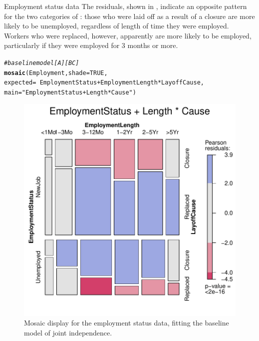 \documentclass[11pt]{book}\usepackage[]{graphicx}\usepackage[]{color}
\makeatletter
\newcommand{\hlnum}[1]{\textcolor[rgb]{0.686,0.059,0.569}{#1}}%
\newcommand{\hlstr}[1]{\textcolor[rgb]{0.192,0.494,0.8}{#1}}%
\newcommand{\hlcom}[1]{\textcolor[rgb]{0.678,0.584,0.686}{\textit{#1}}}%
\newcommand{\hlopt}[1]{\textcolor[rgb]{0,0,0}{#1}}%
\newcommand{\hlstd}[1]{\textcolor[rgb]{0.345,0.345,0.345}{#1}}%
\newcommand{\hlkwc}[1]{\textcolor[rgb]{0.333,0.667,0.333}{#1}}%
\newcommand{\hlkwd}[1]{\textcolor[rgb]{0.737,0.353,0.396}{\textbf{#1}}}%
\newenvironment{kframe}{%
 \def\at@end@of@kframe{}%
 \ifinner\ifhmode%
  \def\at@end@of@kframe{\end{minipage}}%
  \begin{minipage}{\columnwidth}%
 \fi\fi%
 \def\FrameCommand##1{\hskip\@totalleftmargin \hskip-\fboxsep
 \colorbox{shadecolor}{##1}\hskip-\fboxsep
     \hskip-\linewidth \hskip-\@totalleftmargin \hskip\columnwidth}%
 \MakeFramed {\advance\hsize-\width
   \@totalleftmargin\z@ \linewidth\hsize
   \@setminipage}}%
 {\par\unskip\endMakeFramed%
 \at@end@of@kframe}
\newenvironment{knitrout}{}{} %
\renewenvironment{knitrout}{\small\renewcommand{\baselinestretch}{.85}}{} %
\makeatother
\begin{document}
\begin{Example}[employ]{Employment status data}
The residuals, shown in ,
indicate an opposite pattern for the two categories of :
those who were laid off as a result of a closure
are more likely to be unemployed, regardless of length of time
they were employed.
Workers who were replaced, however, apparently are more likely
to be employed, particularly if they were employed for 3 months or more.

\begin{knitrout}
\color{fgcolor}\begin{kframe}
\begin{alltt}
\hlcom{# baseline model [A][BC]}
\hlkwd{mosaic}\hlstd{(Employment,} \hlkwc{shade}\hlstd{=}\hlnum{TRUE}\hlstd{,}
       \hlkwc{expected} \hlstd{=} \hlopt{~} \hlstd{EmploymentStatus} \hlopt{+} \hlstd{EmploymentLength}\hlopt{*}\hlstd{LayoffCause,}
       \hlkwc{main} \hlstd{=} \hlstr{"EmploymentStatus + Length * Cause"}\hlstd{)}
\end{alltt}
\end{kframe}\begin{figure}[htbp]


\centerline{\includegraphics[width=.6\textwidth]{ch05/fig/employ-mos1} }

\caption[Mosaic display for the employment status data, fitting the baseline model of joint independence]{Mosaic display for the employment status data, fitting the baseline model of joint independence.\label{fig:employ-mos1}}
\end{figure}


\end{knitrout}



\end{Example}
\end{document}
